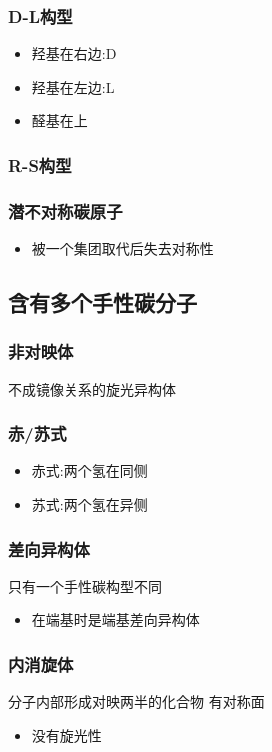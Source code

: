 \documentclass[11pt]{article}
\begin{document}
\subsubsection{D-L构型}
\label{sec:org0d770fa}
\begin{itemize}
\item 羟基在右边:D
\item 羟基在左边:L
\item 醛基在上
\end{itemize}
\subsubsection{R-S构型}
\label{sec:orga1be54f}
\subsubsection{潜不对称碳原子}
\label{sec:org69b363b}
\begin{itemize}
\item 被一个集团取代后失去对称性
\end{itemize}
\subsection{含有多个手性碳分子}
\label{sec:orgdaeb932}
\subsubsection{非对映体}
\label{sec:orgb1902bc}
不成镜像关系的旋光异构体
\subsubsection{赤/苏式}
\label{sec:org5fcf163}
\begin{itemize}
\item 赤式:两个氢在同侧
\item 苏式:两个氢在异侧
\end{itemize}
\subsubsection{差向异构体}
\label{sec:org3d294f8}
只有一个手性碳构型不同
\begin{itemize}
\item 在端基时是端基差向异构体
\end{itemize}

\subsubsection{内消旋体}
\label{sec:orged2eece}
分子内部形成对映两半的化合物
有对称面
\begin{itemize}
\item 没有旋光性
\end{itemize}
\end{document}
